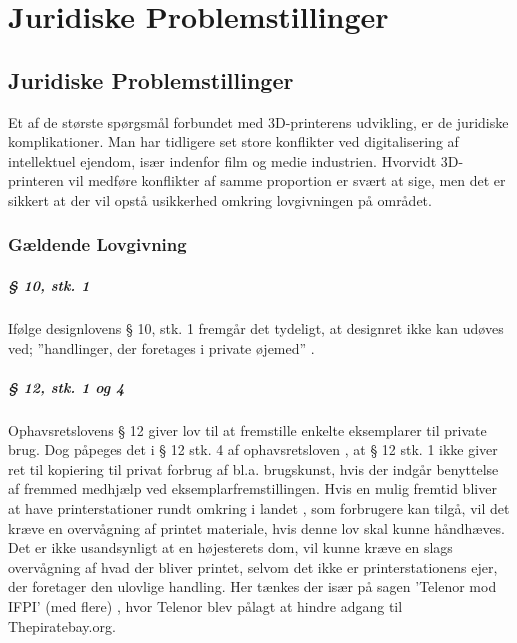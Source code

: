 \chapter{Juridiske Problemstillinger}

\section{Juridiske Problemstillinger}

Et af de største spørgsmål forbundet med 3D-printerens udvikling, er de juridiske komplikationer. Man har tidligere set store konflikter ved digitalisering af intellektuel ejendom, især indenfor film og medie industrien. Hvorvidt 3D-printeren vil medføre konflikter af samme proportion er svært at sige, men det er sikkert at der vil opstå usikkerhed omkring lovgivningen på området.

\subsection{Gældende Lovgivning}

\paragraph{§ 10, stk. 1} %
\label{par:_10_stk_1}


Ifølge designlovens § 10, stk. 1 fremgår det tydeligt, at designret ikke kan udøves ved; ”handlinger, der foretages i private øjemed” \cite{_designloven_????}.

\paragraph{§ 12, stk. 1 og 4} %
\label{par:_12}

 Ophavsretslovens § 12 giver lov til at fremstille enkelte eksemplarer til private brug.
Dog påpeges det i § 12 stk. 4 af ophavsretsloven \cite{jura2}, at § 12 stk. 1 ikke giver ret til kopiering til privat forbrug af bl.a. brugskunst, hvis der indgår benyttelse af fremmed medhjælp ved eksemplarfremstillingen.
Hvis en mulig fremtid bliver at have printerstationer rundt omkring i landet \cite{jura3}, som forbrugere kan tilgå, vil det kræve en overvågning af printet materiale, hvis denne lov skal kunne håndhæves. Det er ikke usandsynligt at en højesterets dom, vil kunne kræve en slags overvågning af hvad der bliver printet, selvom det ikke er printerstationens ejer, der foretager den ulovlige handling. Her tænkes der især på sagen ’Telenor mod IFPI’ (med flere) \cite{jura4}, hvor Telenor blev pålagt at hindre adgang til Thepiratebay.org.

